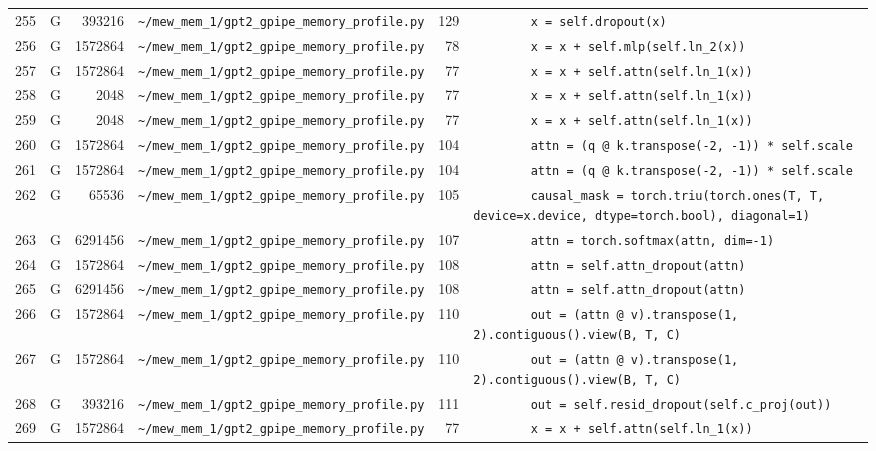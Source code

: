 \documentclass{article}
\begin{document}
\begin{longtable}{r l r p{6.5cm} r p{7.0cm}}
255 & G & 393216 & \lstinline|~/mew_mem_1/gpt2_gpipe_memory_profile.py| & 129 & \lstinline|        x = self.dropout(x)| \\
256 & G & 1572864 & \lstinline|~/mew_mem_1/gpt2_gpipe_memory_profile.py| & 78 & \lstinline|        x = x + self.mlp(self.ln_2(x))| \\
257 & G & 1572864 & \lstinline|~/mew_mem_1/gpt2_gpipe_memory_profile.py| & 77 & \lstinline|        x = x + self.attn(self.ln_1(x))| \\
258 & G & 2048 & \lstinline|~/mew_mem_1/gpt2_gpipe_memory_profile.py| & 77 & \lstinline|        x = x + self.attn(self.ln_1(x))| \\
259 & G & 2048 & \lstinline|~/mew_mem_1/gpt2_gpipe_memory_profile.py| & 77 & \lstinline|        x = x + self.attn(self.ln_1(x))| \\
260 & G & 1572864 & \lstinline|~/mew_mem_1/gpt2_gpipe_memory_profile.py| & 104 & \lstinline|        attn = (q @ k.transpose(-2, -1)) * self.scale| \\
261 & G & 1572864 & \lstinline|~/mew_mem_1/gpt2_gpipe_memory_profile.py| & 104 & \lstinline|        attn = (q @ k.transpose(-2, -1)) * self.scale| \\
262 & G & 65536 & \lstinline|~/mew_mem_1/gpt2_gpipe_memory_profile.py| & 105 & \lstinline|        causal_mask = torch.triu(torch.ones(T, T, device=x.device, dtype=torch.bool), diagonal=1)| \\
263 & G & 6291456 & \lstinline|~/mew_mem_1/gpt2_gpipe_memory_profile.py| & 107 & \lstinline|        attn = torch.softmax(attn, dim=-1)| \\
264 & G & 1572864 & \lstinline|~/mew_mem_1/gpt2_gpipe_memory_profile.py| & 108 & \lstinline|        attn = self.attn_dropout(attn)| \\
265 & G & 6291456 & \lstinline|~/mew_mem_1/gpt2_gpipe_memory_profile.py| & 108 & \lstinline|        attn = self.attn_dropout(attn)| \\
266 & G & 1572864 & \lstinline|~/mew_mem_1/gpt2_gpipe_memory_profile.py| & 110 & \lstinline|        out = (attn @ v).transpose(1, 2).contiguous().view(B, T, C)| \\
267 & G & 1572864 & \lstinline|~/mew_mem_1/gpt2_gpipe_memory_profile.py| & 110 & \lstinline|        out = (attn @ v).transpose(1, 2).contiguous().view(B, T, C)| \\
268 & G & 393216 & \lstinline|~/mew_mem_1/gpt2_gpipe_memory_profile.py| & 111 & \lstinline|        out = self.resid_dropout(self.c_proj(out))| \\
269 & G & 1572864 & \lstinline|~/mew_mem_1/gpt2_gpipe_memory_profile.py| & 77 & \lstinline|        x = x + self.attn(self.ln_1(x))| \\

\end{longtable}
\end{document}
